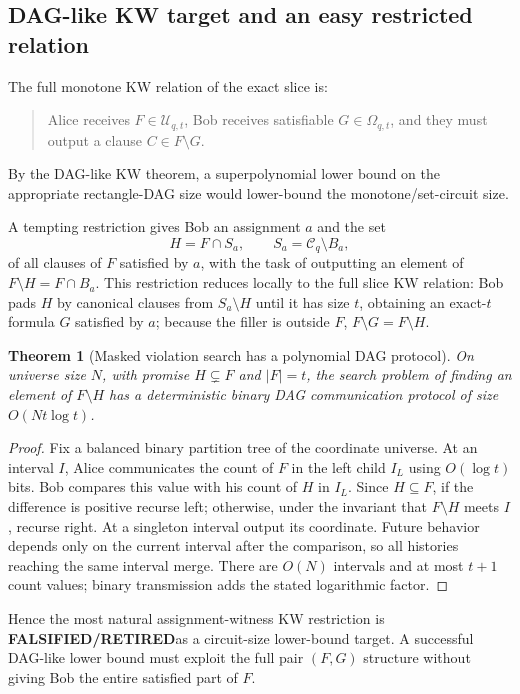\documentclass[11pt]{article}
\newtheorem{theorem}{Theorem}
\newcommand{\RET}{\textbf{FALSIFIED/RETIRED}}
\begin{document}
\subsection{DAG-like KW target and an easy restricted relation}
The full monotone KW relation of the exact slice is:
\begin{quote}
Alice receives $F\in\mathcal U_{q,t}$, Bob receives satisfiable $G\in\Omega_{q,t}$, and they must output a clause $C\in F\setminus G$.
\end{quote}
By the DAG-like KW theorem, a superpolynomial lower bound on the appropriate rectangle-DAG size would lower-bound the monotone/set-circuit size.

A tempting restriction gives Bob an assignment $a$ and the set
\[H=F\cap S_a,\qquad S_a=\mathcal C_q\setminus B_a,\]
of all clauses of $F$ satisfied by $a$, with the task of outputting an element of $F\setminus H=F\cap B_a$. This restriction reduces locally to the full slice KW relation: Bob pads $H$ by canonical clauses from $S_a\setminus H$ until it has size $t$, obtaining an exact-$t$ formula $G$ satisfied by $a$; because the filler is outside $F$, $F\setminus G=F\setminus H$.

\begin{theorem}[Masked violation search has a polynomial DAG protocol]
On universe size $N$, with promise $H\subsetneq F$ and $|F|=t$, the search problem of finding an element of $F\setminus H$ has a deterministic binary DAG communication protocol of size $O(Nt\log t)$.
\end{theorem}
\begin{proof}
Fix a balanced binary partition tree of the coordinate universe. At an interval $I$, Alice communicates the count of $F$ in the left child $I_L$ using $O(\log t)$ bits. Bob compares this value with his count of $H$ in $I_L$. Since $H\subseteq F$, if the difference is positive recurse left; otherwise, under the invariant that $F\setminus H$ meets $I$, recurse right. At a singleton interval output its coordinate. Future behavior depends only on the current interval after the comparison, so all histories reaching the same interval merge. There are $O(N)$ intervals and at most $t+1$ count values; binary transmission adds the stated logarithmic factor.
\end{proof}

Hence the most natural assignment-witness KW restriction is \RET as a circuit-size lower-bound target. A successful DAG-like lower bound must exploit the full pair $(F,G)$ structure without giving Bob the entire satisfied part of $F$.
\end{document}

